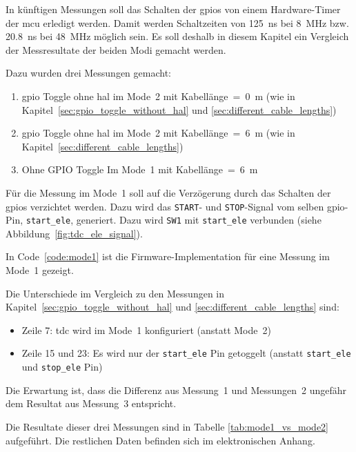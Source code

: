 In künftigen Messungen soll das Schalten der \acrshort{gpio}s von einem Hardware-Timer der \acrshort{mcu} erledigt
werden. Damit werden Schaltzeiten von 125~ns bei 8~MHz bzw. 20.8~ns bei 48~MHz möglich sein. Es soll deshalb in diesem
Kapitel ein Vergleich der Messresultate der beiden Modi gemacht werden.

Dazu wurden drei Messungen gemacht:
\begin{enumerate}
    \item \acrshort{gpio} Toggle ohne \acrshort{hal} im Mode~2 mit Kabellänge~=~0~m (wie in Kapitel~\ref{sec:gpio_toggle_without_hal} und \ref{sec:different_cable_lengths})
    \item \acrshort{gpio} Toggle ohne \acrshort{hal} im Mode~2 mit Kabellänge~=~6~m (wie in Kapitel~\ref{sec:different_cable_lengths})
    \item Ohne GPIO Toggle Im Mode~1 mit Kabellänge~=~6~m
\end{enumerate}

Für die Messung im Mode~1 soll auf die Verzögerung durch das Schalten der \acrshort{gpio}s verzichtet werden. Dazu wird
das \lstinline|START|- und \lstinline|STOP|-Signal vom selben \acrshort{gpio}-Pin, \lstinline|start_ele|, generiert.
Dazu wird \lstinline|SW1| mit \lstinline|start_ele| verbunden (siehe Abbildung~\ref{fig:tdc_ele_signal}).

In Code~\ref{code:mode1} ist die Firmware-Implementation für eine Messung im Mode~1 gezeigt.



Die Unterschiede im Vergleich zu den Messungen in Kapitel~\ref{sec:gpio_toggle_without_hal} und
\ref{sec:different_cable_lengths} sind:

\begin{itemize}
    \item Zeile 7: \acrshort{tdc} wird im Mode~1 konfiguriert (anstatt Mode~2)
    \item Zeile 15 und 23: Es wird nur der \lstinline|start_ele| Pin getoggelt (anstatt \lstinline|start_ele| und \lstinline|stop_ele| Pin)
\end{itemize}

Die Erwartung ist, dass die Differenz aus Messung~1 und Messungen~2 ungefähr dem Resultat aus Messung~3 entspricht.

Die Resultate dieser drei Messungen sind in Tabelle \ref{tab:mode1_vs_mode2} aufgeführt. Die restlichen Daten befinden
sich im elektronischen Anhang.

